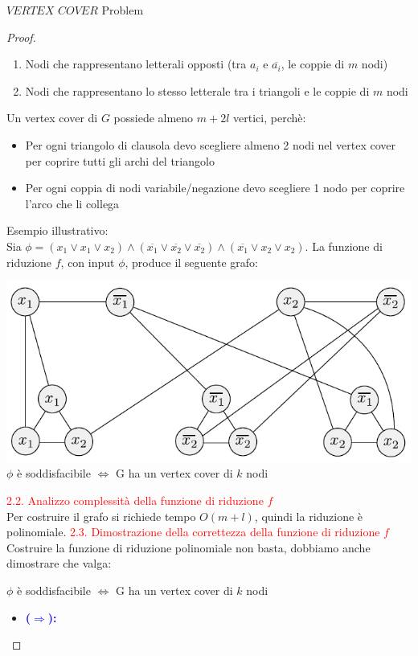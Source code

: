 \documentclass{article}  %
\theoremstyle{definition}
\begin{document}
\begin{theorem}{$VERTEX$ $COVER$ Problem}
\begin{proof}
\begin{enumerate}
\begin{enumerate}
				      \item Nodi che rappresentano letterali opposti (tra $a_i$ e $\overline{a_i}$, le coppie di $m$ nodi)
				      \item Nodi che rappresentano lo stesso letterale tra i triangoli e le coppie di $m$ nodi
			      \end{enumerate}
		\end{enumerate}
		Un vertex cover di $G$ possiede almeno $m+2l$ vertici, perchè:
		\begin{itemize}
			\item Per ogni triangolo di clausola devo scegliere almeno 2 nodi nel vertex cover per coprire tutti gli archi del triangolo
			\item Per ogni coppia di nodi variabile/negazione devo scegliere 1 nodo per coprire l'arco che li collega
		\end{itemize}
		Esempio illustrativo: \\
		Sia $\phi = (x_1 \lor x_1 \lor x_2) \land (\overline{x_1} \lor \overline{x_2} \lor \overline{x_2}) \land (\overline{x_1} \lor x_2 \lor x_2)$. La funzione di riduzione $f$, con input $\phi$,
		produce il seguente grafo:
		\begin{center}
			\includegraphics[width=0.7\linewidth]{vertex-cover-ex.png} \\
			$\phi$ è soddisfacibile $\iff$ G ha un vertex cover di $k$ nodi
		\end{center}
		\textcolor{red}{2.2. Analizzo complessità della funzione di riduzione $f$} \\
		Per costruire il grafo si richiede tempo $O(m+l)$, quindi la riduzione è polinomiale.
		\textcolor{red}{2.3. Dimostrazione della correttezza della funzione di riduzione $f$} \\
		Costruire la funzione di riduzione polinomiale non basta, dobbiamo anche dimostrare che valga:
		\begin{center}
			$\phi$ è soddisfacibile $\iff$ G ha un vertex cover di $k$ nodi
		\end{center}
		\begin{itemize}
			\item \textcolor{blue}{\textbf{($\Longrightarrow$):}}

\end{itemize}
\end{proof}
\end{theorem}
\end{document}
